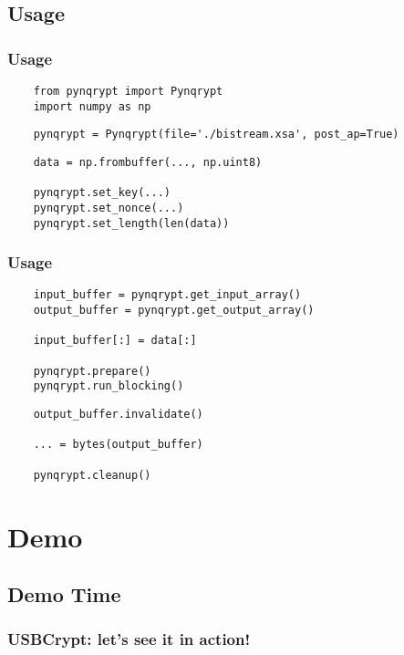 \documentclass{beamer}
\begin{document}
\subsection{Usage}
\begin{frame}[fragile]
    \frametitle{Usage}

    \begin{lstlisting}
    from pynqrypt import Pynqrypt
    import numpy as np
    \end{lstlisting}

    \begin{lstlisting}
    pynqrypt = Pynqrypt(file='./bistream.xsa', post_ap=True)
    \end{lstlisting}

    \begin{lstlisting}
    data = np.frombuffer(..., np.uint8)

    pynqrypt.set_key(...)
    pynqrypt.set_nonce(...)
    pynqrypt.set_length(len(data))
    \end{lstlisting}
\end{frame}

\begin{frame}[fragile]
    \frametitle{Usage}

    \begin{lstlisting}
    input_buffer = pynqrypt.get_input_array()
    output_buffer = pynqrypt.get_output_array()

    input_buffer[:] = data[:]

    pynqrypt.prepare()
    pynqrypt.run_blocking()
    \end{lstlisting}

    \begin{lstlisting}
    output_buffer.invalidate()

    ... = bytes(output_buffer)

    pynqrypt.cleanup()
    \end{lstlisting}
\end{frame}

\section{Demo}

\subsection{Demo Time}
\begin{frame}
    \frametitle{USBCrypt: let's see it in action!}
\end{frame}
\end{document}
